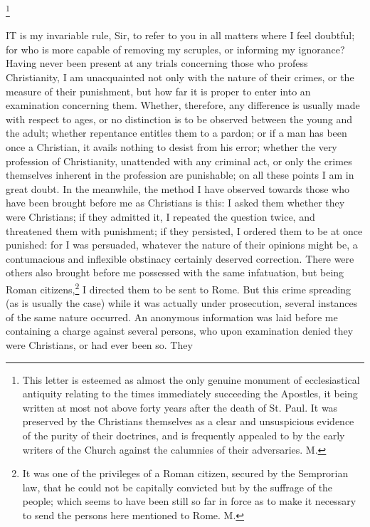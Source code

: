 
\footnote{This letter is
esteemed as almost the only genuine monument of ecclesiastical antiquity
relating to the times immediately succeeding the Apostles, it being
written at most not above forty years after the death of St. Paul. It was
preserved by the Christians themselves as a clear and unsuspicious
evidence of the purity of their doctrines, and is frequently appealed to
by the early writers of the Church against the calumnies of their
adversaries. M.}

IT is my invariable rule, Sir, to refer to you in all matters where I feel
doubtful; for who is more capable of removing my scruples, or informing my
ignorance? Having never been present at any trials concerning those who
profess Christianity, I am unacquainted not only with the nature of their
crimes, or the measure of their punishment, but how far it is proper to
enter into an examination concerning them. Whether, therefore, any
difference is usually made with respect to ages, or no distinction is to
be observed between the young and the adult; whether repentance entitles
them to a pardon; or if a man has been once a Christian, it avails nothing
to desist from his error; whether the very profession of Christianity,
unattended with any criminal act, or only the crimes themselves inherent
in the profession are punishable; on all these points I am in great doubt.
In the meanwhile, the method I have observed towards those who have been
brought before me as Christians is this: I asked them whether they were
Christians; if they admitted it, I repeated the question twice, and
threatened them with punishment; if they persisted, I ordered them to be
at once punished: for I was persuaded, whatever the nature of their
opinions might be, a contumacious and inflexible obstinacy certainly
deserved correction. There were others also brought before me possessed
with the same infatuation, but being Roman citizens,\footnote{It was one of the
privileges of a Roman citizen, secured by the Semprorian law, that he
could not be capitally convicted but by the suffrage of the people; which
seems to have been still so far in force as to make it necessary to send
the persons here mentioned to Rome. M.}
I directed them to be sent to Rome. But this crime spreading (as is
usually the case) while it was actually under prosecution, several
instances of the same nature occurred. An anonymous information was laid
before me containing a charge against several persons, who upon
examination denied they were Christians, or had ever been so. They
